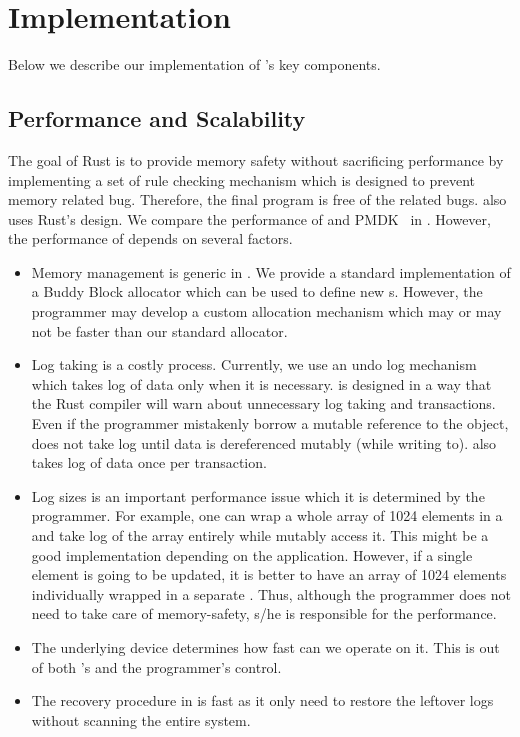 \section{Implementation}
\label{sec:impl}

Below we describe our implementation of \this{}'s key components.

\subsection{Performance and Scalability}
\label{sec:perf}

The goal of Rust is to provide memory safety without sacrificing performance by implementing a set of rule checking mechanism which is designed to prevent memory related bug. Therefore, the final program is free of the related bugs. \this{} also uses Rust's design. We compare the performance of \this{} and PMDK~\cite{pmdk} in . However, the performance of \this{} depends on several factors.

\begin{itemize}
    \item Memory management is generic in \this{}. We provide a standard implementation of a Buddy Block allocator which can be used to define new s. However, the programmer may develop a custom allocation mechanism which may or may not be faster than our standard allocator.
    \item Log taking is a costly process. Currently, we use an undo log mechanism which takes log of data only when it is necessary. \this{} is designed in a way that the Rust compiler will warn about unnecessary log taking and transactions. Even if the programmer mistakenly borrow a mutable reference to the object, \this{} does not take log until data is dereferenced mutably (while writing to). \this{} also takes log of data once per transaction.
    \item Log sizes is an important performance issue which it is determined by the programmer. For example, one can wrap a whole array of 1024 elements in a  and take log of the array entirely while mutably access it. This might be a good implementation depending on the application. However, if a single element is going to be updated, it is better to have an array of 1024 elements individually wrapped in a separate . Thus, although the programmer does not need to take care of memory-safety, s/he is responsible for the performance.
    \item The underlying device determines how fast can we operate on it. This is out of both \this{}'s and the programmer's control.
    \item The recovery procedure in \this{} is fast as it only need to restore the leftover logs without scanning the entire system.
\end{itemize}

